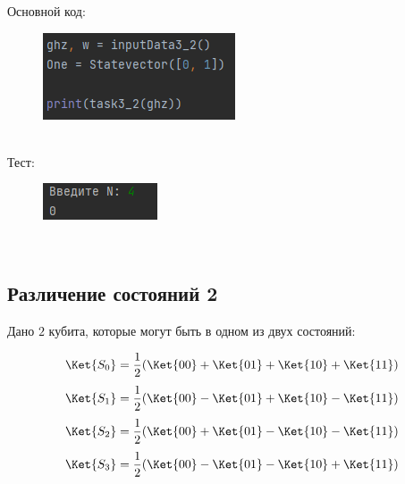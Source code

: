 \documentclass{article}
\begin{document}
Основной код: \\
\begin{figure}[h]
        \centering
        \includegraphics{pictures/main3.2.png}
   \end{figure}\\
Тест: \\
\begin{figure}[h]
        \centering
        \includegraphics{pictures/test3.2.png}
   \end{figure}\\

\subsection{Различение состояний 2}

Дано $2$ кубита, которые могут быть в одном из двух состояний:

$$\Ket{S_0} = \frac{1}{2}(\Ket{00} + \Ket{01} + \Ket{10} + \Ket{11})$$
$$\Ket{S_1} = \frac{1}{2}(\Ket{00} - \Ket{01} + \Ket{10} - \Ket{11})$$
$$\Ket{S_2} = \frac{1}{2}(\Ket{00} + \Ket{01} - \Ket{10} - \Ket{11})$$
$$\Ket{S_3} = \frac{1}{2}(\Ket{00} - \Ket{01} - \Ket{10} + \Ket{11})$$
\end{document}
